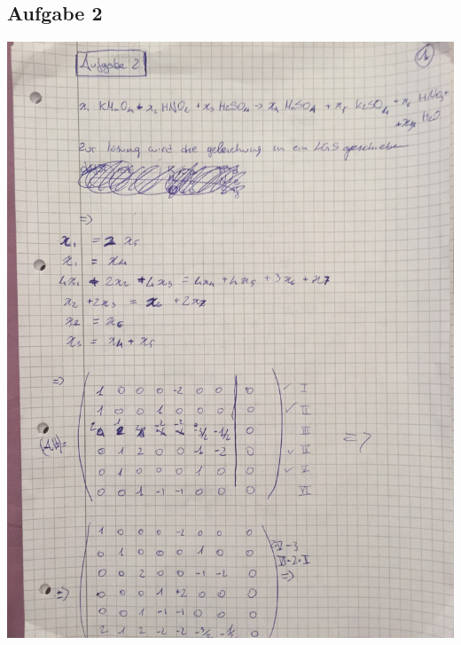 \documentclass[10pt,a4paper]{article}
\begin{document}
\subsection{Aufgabe 2}
\includegraphics[scale=0.2, angle=270]{A2_1.jpg}
\newpage
\end{document}
